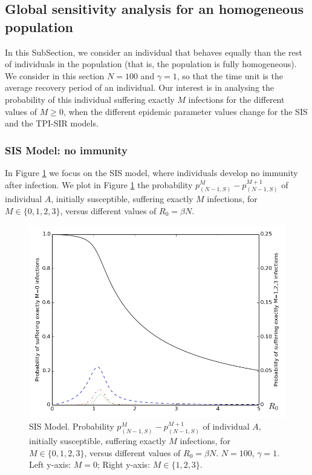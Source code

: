 \documentclass[preprint,12pt]{elsarticle}
\begin{document}
\subsection{Global sensitivity analysis for an homogeneous population}
\label{SubSect31}

\par In this SubSection, we consider an individual that behaves equally than the rest of individuals in the population (that is, the population is fully homogeneous). We consider in this section $N=100$ and $\gamma=1$, so that the time unit is the average recovery period of an individual. Our interest is in analysing the probability of this individual suffering exactly $M$ infections for the different values of $M\geq0$, when the different epidemic parameter values change for the SIS and the TPI-SIR models. 

\subsubsection{SIS Model: no immunity}

\par In Figure \ref{fig:sis_homogeneous} we focus on the SIS model, where individuals develop no immunity after infection. We plot in Figure \ref{fig:sis_homogeneous} the probability $p_{(N-1,S)}^M-p_{(N-1,S)}^{M+1}$ of individual $A$, initially susceptible, suffering exactly $M$ infections, for $M\in\{0,1,2,3\}$, versus different values of $R_0=\beta N$.
\begin{figure}[h!]
  \centering
 \includegraphics[width=\textwidth]{SIS_Homogeneous.jpg}
 \caption{SIS Model. Probability $p_{(N-1,S)}^M-p_{(N-1,S)}^{M+1}$ of individual $A$, initially susceptible, suffering exactly $M$ infections, for $M\in\{0,1,2,3\}$, versus different values of $R_0=\beta N$. $N=100$, $\gamma=1$. Left y-axis: $M=0$; Right y-axis: $M\in\{1,2,3\}$.}
  \label{fig:sis_homogeneous}
\end{figure}
\end{document}
